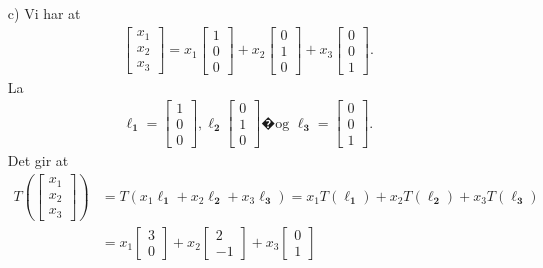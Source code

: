 \documentclass[a4paper, norsk, 12pt]{extarticle}
\begin{document}
\begin{itemize}
\item[c)]
Vi har at
\begin{align*}
\begin{bmatrix} x_1 \\ x_2 \\ x_3 \end{bmatrix}
= x_1 \begin{bmatrix} 1 \\0 \\ 0 \end{bmatrix} + x_2 \begin{bmatrix} 0\\1\\0 \end{bmatrix} + x_3 \begin{bmatrix} 0 \\0 \\ 1 \end{bmatrix}.
\end{align*}
La
\begin{align*}
\boldsymbol{\ell_1} = \begin{bmatrix} 1 \\0 \\ 0 \end{bmatrix}, \boldsymbol{\ell_2} \begin{bmatrix} 0\\1\\0 \end{bmatrix} \text{�og } \boldsymbol{\ell_3} = \begin{bmatrix} 0 \\0 \\ 1 \end{bmatrix}.
\end{align*}
Det gir at
\begin{align*}
T\left( \begin{bmatrix} x_1 \\ x_2 \\ x_3 \end{bmatrix} \right)
&= T\left(x_1 \boldsymbol{\ell_1} + x_2 \boldsymbol{\ell_2} + x_3 \boldsymbol{\ell_3}\right)
= x_1T\left(\boldsymbol{\ell_1} \right) + x_2 T\left(\boldsymbol{\ell_2} \right) + x_3 T\left(\boldsymbol{\ell_3} \right) \\
&= x_1\begin{bmatrix} 3 \\ 0 \end{bmatrix} + x_2 \begin{bmatrix} 2 \\ -1 \end{bmatrix} + x_3 \begin{bmatrix} 0 \\ 1 \end{bmatrix}

\end{align*}
\end{itemize}
\end{document}
